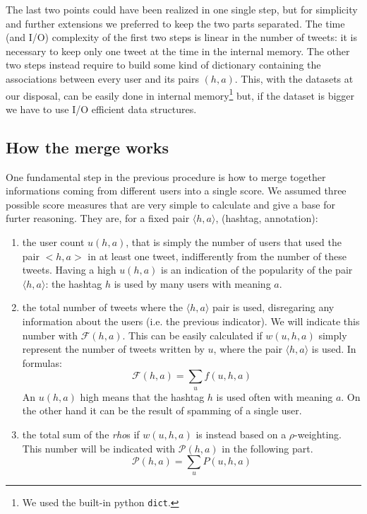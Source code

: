 \documentclass[a4paper,11pt,oneside]{article}
\begin{document}
The last two points could have been realized in one single step, but for simplicity and further extensions we preferred to keep the two parts separated. The time (and I/O) complexity of the first two steps is linear in the number of tweets: it is necessary to keep only one tweet at the time in the internal memory. 
The other two steps instead require to build some kind of dictionary containing the associations between every user and its pairs $(h,a)$. This, with the datasets at our disposal, can be easily done in internal memory\footnote{We used the built-in python \texttt{dict}.} but, if the dataset is bigger we have to use I/O efficient data structures.


\subsection{How the merge works}
\label{sec:merge}
One fundamental step in the previous procedure is how to merge together informations coming from different users into a single score. We assumed three possible score measures that are very simple to calculate and give a base for furter reasoning. They are, for a fixed pair $\langle h,a \rangle$, (hashtag, annotation):
\begin{enumerate}
\item the user count $u(h,a)$, that is simply the number of users that used the pair $<h,a>$ in at least one tweet, indifferently from the number of these tweets. Having a high $u(h,a)$ is an indication of the popularity of the pair $\langle h,a \rangle$: the hashtag $h$ is used by many users with meaning $a$.

\item the total number of tweets where the $\langle h,a \rangle$ pair is used, disregaring any information about the users (i.e. the previous indicator). We will indicate this number with $\mathcal{F}(h,a)$. This can be easily calculated if $w(u,h,a)$ simply represent the number of tweets written by $u$, where the pair $\langle h,a \rangle$ is used. In formulas:
\begin{equation}
\label{eqn:frequency}
\mathcal{F}(h,a) = \sum_{u} f(u,h,a)
\end{equation}
An $u(h,a)$ high means that the hashtag $h$ is used often with meaning $a$. On the other hand it can be the result of spamming of a single user.

\item the total sum of the \textit{rho}s if $w(u,h,a)$ is instead based on a $\rho$-weighting. This number will be indicated with $\mathcal{P}(h,a)$ in the following part.
\begin{equation}
\mathcal{P}(h,a) = \sum_{u} P(u,h,a)
\end{equation}
\end{enumerate}
\end{document}
